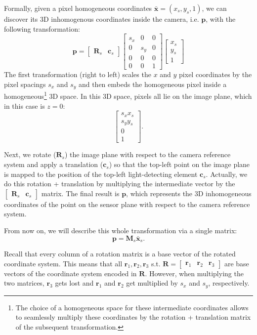 Formally, given a pixel homogeneous coordinates $\bar{\mathbf{x}}=(x_{s},y_{s},1)$, we can discover its 3D inhomogenous coordinates inside the camera, i.e. $\mathbf{p}$, with the following transformation:
$$\mathbf{p}=\begin{bmatrix}
\mathbf{R}_{s} & \mathbf{c}_{s}
\end{bmatrix}
\begin{bmatrix}
s_{x} & 0 & 0 \\
0 & s_{y} & 0 \\
0 & 0 & 0 \\
0 & 0 & 1
\end{bmatrix}
\begin{bmatrix}
x_{s} \\
y_{s} \\
1
\end{bmatrix}
$$
The first transformation (right to left) scales the $x$ and $y$ pixel coordinates by the pixel spacings $s_x$ and $s_y$ and then embeds the homogeneous pixel inside a homogeneous\footnote{The choice of a homogeneous space for these intermediate coordinates allows to seamlessly multiply these coordinates by the rotation + translation matrix of the subsequent transformation.} 3D space. In this 3D space, pixels all lie on the image plane, which in this case is $z=0$:
$$\begin{bmatrix}
s_xx_s \\
s_yy_s \\
0 \\
1
\end{bmatrix}.$$

Next, we rotate ($\mathbf{R}_s$) the image plane with respect to the camera reference system and apply a translation ($\mathbf{c}_s$) so that the top-left point on the image plane is mapped to the position of the top-left light-detecting element $\mathbf{c}_s$.
Actually, we do this rotation + translation by multiplying the intermediate vector by the $\begin{bmatrix} \mathbf{R}_s & \mathbf{c}_s \end{bmatrix}$ matrix.
The final result is $\mathbf{p}$, which represents the 3D inhomogeneous coordinates of the point on the sensor plane with respect to the camera reference system.

From now on, we will describe this whole transformation via a single matrix:
$$\mathbf{p}=\mathbf{M}_{s}\bar{\mathbf{x}}_{s}.$$

Recall that every column of a rotation matrix is a base vector of the rotated coordinate system. This means that all $\mathbf{r}_{1},\mathbf{r}_{2},\mathbf{r}_{3}$ s.t. $\mathbf{R}=\begin{bmatrix}\mathbf{r}_{1}& \mathbf{r}_{2} & \mathbf{r}_{3}\end{bmatrix}$ are base vectors of the coordinate system encoded in $\mathbf{R}$.
However, when multiplying the two matrices, $\mathbf{r}_{3}$ gets lost and $\mathbf{r}_{1}$ and $\mathbf{r}_{2}$ get multiplied by $s_{x}$ and $s_{y}$, respectively.

